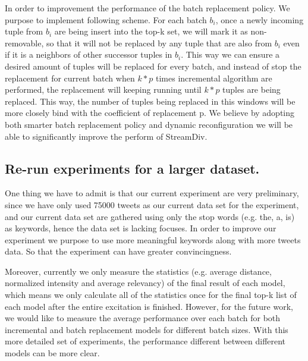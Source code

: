 In order to improvement the performance of the batch replacement policy. We purpose to implement following scheme. For each batch $b_i$, once a newly incoming tuple from $b_i$ are being insert into the top-k set, we will mark it as non-removable, so that it will not be replaced by any tuple that are also from $b_i$ even if it is a neighbors of other successor tuples in $b_i$. This way we can ensure a desired amount of tuples will be replaced for every batch, and instead of stop the replacement for current batch when $k * p$ times incremental algorithm are performed, the replacement will keeping running until $k*p$ tuples are being replaced. This way, the number of tuples being replaced in this windows will be more closely bind with the coefficient of replacement p. We believe by adopting both smarter batch replacement policy and dynamic reconfiguration we will be able to significantly improve the perform of StreamDiv.

\subsection{Re-run experiments for a larger dataset.}

One thing we have to admit is that our current experiment are very preliminary, since we have only used 75000 tweets as our current data set for the experiment, and our current data set are gathered using only the stop words (e.g. the, a, is) as keywords, hence the data set is lacking focuses. In order to improve our experiment we purpose to use more meaningful keywords along with more tweets data. So that the experiment can have greater convincingness. 

Moreover, currently we only measure the statistics (e.g. average distance, normalized intensity and average relevancy) of the final result of each model, which means we only calculate all of the statistics once for the final top-k list of each model after the entire excitation is finished. However, for the future work, we would like to measure the average performance over each batch for both incremental and batch replacement models for different batch sizes. With this more detailed set of experiments, the performance different between different models can be more clear. 

